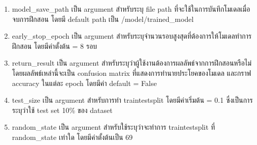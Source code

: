 \begin{enumerate}
    \item
    model\_save\_path เป็น argument สำหรับระบุ file path ที่จะใช้ในการบันทึกโมเดลเมื่อจบการฝึกสอน 
    โดยมี default path เป็น /model/trained\_model
    \item
    early\_stop\_epoch เป็น argument สำหรับระบุจำนวนรอบสูงสุดที่ต้องการให้โมเดลทำการฝึกสอน
    โดยมีค่าตั้งต้น = 8 รอบ
    \item
    return\_result เป็น argument สำหรับระบุว่าผู้ใช้งานต้องการผลลัพธ์จากการฝึกสอนหรือไม่ โดยผลลัพธ์เหล่านี้จะเป็น confusion matrix ที่แสดงการทำนายประโยคของโมเดล 
    และกราฟ accuracy ในแต่ละ epoch โดยมีค่า default = False
    \item
    test\_size เป็น argument สำหรับการทำ train\-test\-split 
    โดยมีค่าเริ่มต้น = 0.1 ซึ่งเป็นการระบุว่าใช้ test set 10\% ของ dataset
    \item
    random\_state เป็น argument สำหรับใช้ระบุว่าจะทำการ train\-test\-split 
    ที่ random\_state เท่าใด โดยมีค่าตั้งต้นเป็น 69
\end{enumerate}



